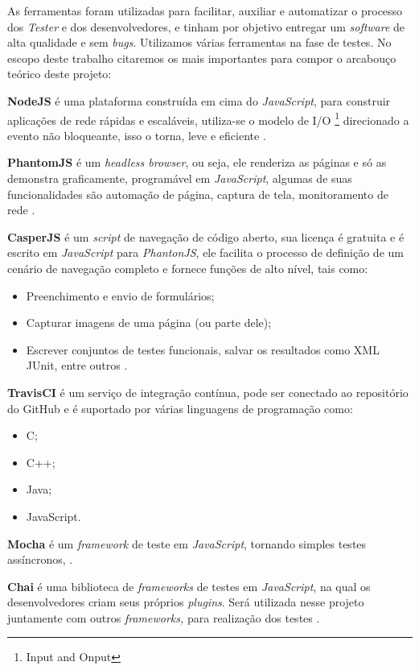 \par As ferramentas foram utilizadas para facilitar, auxiliar e automatizar o processo dos \textit{Tester} e dos desenvolvedores, e tinham por objetivo entregar um \textit{software} de alta qualidade e sem \textit{bugs}. Utilizamos várias ferramentas  na fase de testes. No escopo deste trabalho citaremos os mais importantes para compor o arcabouço teórico deste projeto:


\textbf{NodeJS} é uma plataforma construída em cima do \textit{JavaScript}, para construir aplicações de rede rápidas e escaláveis, utiliza-se o modelo de I/O \footnote{Input and Onput} direcionado a evento não bloqueante, isso o torna, leve e eficiente \cite{node}.
 
 \textbf{PhantomJS} é um \textit{headless browser}, ou seja, ele  renderiza as páginas e só  as demonstra graficamente, programável em \textit{JavaScript}, algumas de suas funcionalidades são automação de página, captura de tela, monitoramento de rede \cite{phantom}.

 \textbf{CasperJS} é um \textit{script} de navegação de código aberto, sua licença é gratuita e é escrito em \textit{JavaScript} para \textit{PhantonJS}, ele facilita o processo de definição de um cenário de navegação completo e fornece funções de alto nível, tais como:
 \begin{itemize}
     \item Preenchimento e envio de formulários;
      \item Capturar imagens de uma página (ou parte dele);
      \item Escrever conjuntos de testes funcionais, salvar os resultados como XML JUnit, entre outros \cite{casper}.
 \end{itemize}
 
 \textbf{TravisCI} é um serviço de integração contínua, pode ser conectado ao repositório do GitHub e é suportado por várias linguagens de programação como:
 \begin{itemize}
     \item  C;
     \item C++;
     \item Java;
     \item JavaScript.
 \end{itemize}
 

\textbf{Mocha} é um \textit{framework} de teste em \textit{JavaScript}, tornando simples testes assíncronos, \cite{mocha}.

\textbf{Chai} é uma biblioteca de \textit{frameworks} de testes em \textit{JavaScript}, na qual os desenvolvedores criam seus próprios \textit{plugins}. Será utilizada nesse projeto juntamente com outros \textit{frameworks,} para realização dos testes \cite{chai}.


